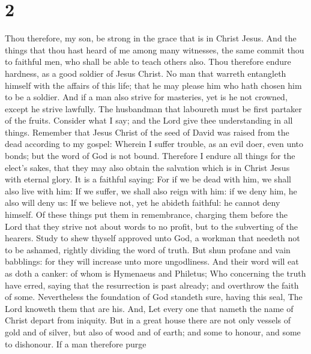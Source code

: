 \hypertarget{section-1}{%
\section{2}\label{section-1}}

 Thou therefore, my son, be strong in the grace that is in
Christ Jesus.  And the things that thou hast heard of me
among many witnesses, the same commit thou to faithful men, who shall be
able to teach others also.  Thou therefore endure hardness,
as a good soldier of Jesus Christ.  No man that warreth
entangleth himself with the affairs of this life; that he may please him
who hath chosen him to be a soldier.  And if a man also
strive for masteries, yet is he not crowned, except he strive lawfully.
 The husbandman that laboureth must be first partaker of the
fruits.  Consider what I say; and the Lord give thee
understanding in all things.  Remember that Jesus Christ of
the seed of David was raised from the dead according to my gospel:
 Wherein I suffer trouble, as an evil doer, even unto bonds;
but the word of God is not bound.  Therefore I endure all
things for the elect's sakes, that they may also obtain the salvation
which is in Christ Jesus with eternal glory.  It is a
faithful saying: For if we be dead with him, we shall also live with
him:  If we suffer, we shall also reign with him: if we
deny him, he also will deny us:  If we believe not, yet he
abideth faithful: he cannot deny himself.  Of these things
put them in remembrance, charging them before the Lord that they strive
not about words to no profit, but to the subverting of the hearers.
 Study to shew thyself approved unto God, a workman that
needeth not to be ashamed, rightly dividing the word of truth.
 But shun profane and vain babblings: for they will
increase unto more ungodliness.  And their word will eat as
doth a canker: of whom is Hymenaeus and Philetus;  Who
concerning the truth have erred, saying that the resurrection is past
already; and overthrow the faith of some.  Nevertheless the
foundation of God standeth sure, having this seal, The Lord knoweth them
that are his. And, Let every one that nameth the name of Christ depart
from iniquity.  But in a great house there are not only
vessels of gold and of silver, but also of wood and of earth; and some
to honour, and some to dishonour.  If a man therefore purge
